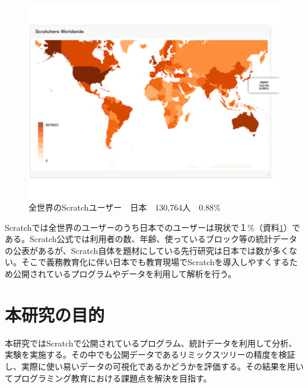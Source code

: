 \documentclass[a4paper,10pt,onecolumn,oneside,openany]{jsbook}
\begin{document}
\begin{figure}[h]
  \centering
    \includegraphics[scale=0.4]{graphic/world_japan.pdf}
  \caption{全世界のScratchユーザー　日本　130,764人　0.88\%}
  \label{num}
\end{figure}

Scratchでは全世界のユーザーのうち日本でのユーザーは現状で１\%（資料\ref{num}）である。Scratch公式では利用者の数、年齢、使っているブロック等の統計データの公表があるが、Scratch自体を題材にしている先行研究は日本では数が多くない。そこで義務教育化に伴い日本でも教育現場でScratchを導入しやすくするため公開されているプログラムやデータを利用して解析を行う。

\newpage
\section{本研究の目的}

本研究ではScratchで公開されているプログラム、統計データを利用して分析、実験を実施する。その中でも公開データであるリミックスツリーの精度を検証し、実際に使い易いデータの可視化であるかどうかを評価する。その結果を用いてプログラミング教育における課題点を解決を目指す。


\end{document}
